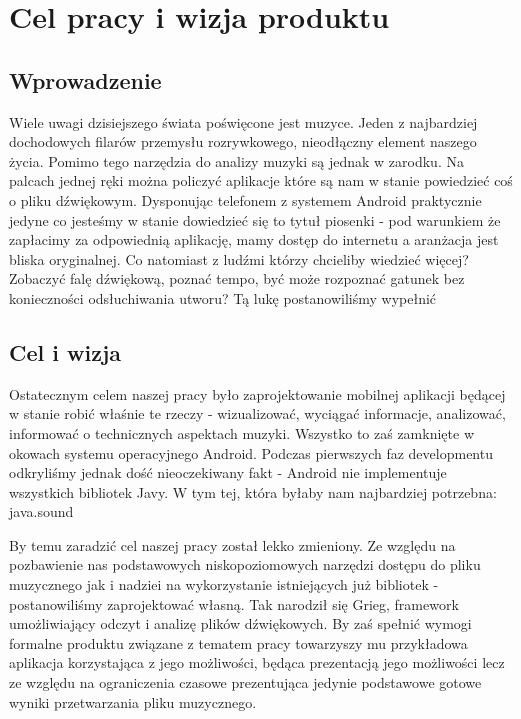 \chapter{Cel pracy i wizja produktu}

\section{Wprowadzenie}
Wiele uwagi dzisiejszego świata poświęcone jest muzyce. Jeden z najbardziej dochodowych filarów przemysłu rozrywkowego, nieodłączny element naszego życia. Pomimo tego narzędzia do analizy muzyki są jednak w zarodku. Na palcach jednej ręki można policzyć aplikacje które są nam w stanie powiedzieć coś o pliku dźwiękowym. Dysponując telefonem z systemem Android praktycznie jedyne co jesteśmy w stanie dowiedzieć się to tytuł piosenki - pod warunkiem że zapłacimy za odpowiednią aplikację, mamy dostęp do internetu a aranżacja jest bliska oryginalnej. Co natomiast z ludźmi którzy chcieliby wiedzieć więcej? Zobaczyć falę dźwiękową, poznać tempo, być może rozpoznać gatunek bez konieczności odsłuchiwania utworu? Tą lukę postanowiliśmy wypełnić
\section{Cel i wizja}
Ostatecznym celem naszej pracy było zaprojektowanie mobilnej aplikacji będącej w stanie robić właśnie te rzeczy - wizualizować, wyciągać informacje, analizować, informować o technicznych aspektach muzyki. Wszystko to zaś zamknięte w okowach systemu operacyjnego Android. Podczas pierwszych faz developmentu odkryliśmy jednak dość nieoczekiwany fakt - Android nie implementuje wszystkich bibliotek Javy. W tym tej, która byłaby nam najbardziej potrzebna: java.sound

By temu zaradzić cel naszej pracy został lekko zmieniony. Ze względu na pozbawienie nas podstawowych niskopoziomowych narzędzi dostępu do pliku muzycznego jak i nadziei na wykorzystanie istniejących już bibliotek - postanowiliśmy zaprojektować własną. Tak narodził się Grieg, framework umożliwiający odczyt i analizę plików dźwiękowych. By zaś spełnić wymogi formalne produktu związane z tematem pracy towarzyszy mu przykładowa aplikacja korzystająca z jego możliwości, będąca prezentacją jego możliwości lecz ze względu na ograniczenia czasowe prezentująca jedynie podstawowe gotowe wyniki przetwarzania pliku muzycznego.

